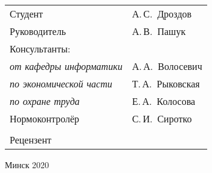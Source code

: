 \begin{titlepage}
\begin{center}
    \begin{tabular}{ p{}p{} }
      Студент & А.\,С.~Дроздов \\
      Руководитель & А.\,В.~Пашук \\
      Консультанты: &\\
      \hspace*{3ex}\emph{от кафедры информатики} & А.\,А.~Волосевич \\
      \hspace*{3ex}\emph{по экономической части} & Т.\,А.~Рыковская \\
      \hspace*{3ex}\emph{по охране труда} & Е.\,А.~Колосова \\
      Нормоконтролёр & С.\,И.~Сиротко\\
      & \\
      Рецензент &
    \end{tabular}

    \vfill
    {\normalsize Минск 2020}
  \end{center}
\end{titlepage}
